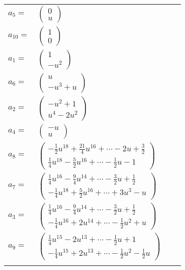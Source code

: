 \documentclass[1p]{elsarticle_modified}
\theoremstyle{definition}
\begin{document}
\begin{tabular}{m{7pt} m{180pt} m{7pt} m{180pt} }
\flushright $a_{5}=$&$\begin{pmatrix}0\\u\end{pmatrix}$ \\
\flushright $a_{10}=$&$\begin{pmatrix}1\\0\end{pmatrix}$ \\
\flushright $a_{1}=$&$\begin{pmatrix}1\\- u^2\end{pmatrix}$ \\
\flushright $a_{6}=$&$\begin{pmatrix}u\\- u^3+u\end{pmatrix}$ \\
\flushright $a_{2}=$&$\begin{pmatrix}- u^2+1\\u^4-2 u^2\end{pmatrix}$ \\
\flushright $a_{4}=$&$\begin{pmatrix}- u\\u\end{pmatrix}$ \\
\flushright $a_{8}=$&$\begin{pmatrix}-\frac{1}{2} u^{18}+\frac{21}{4} u^{16}+\cdots-2 u+\frac{3}{2}\\\frac{1}{4} u^{18}-\frac{5}{2} u^{16}+\cdots-\frac{1}{2} u-1\end{pmatrix}$ \\
\flushright $a_{7}=$&$\begin{pmatrix}\frac{1}{4} u^{16}-\frac{9}{4} u^{14}+\cdots-\frac{3}{2} u+\frac{1}{2}\\-\frac{1}{4} u^{18}+\frac{5}{2} u^{16}+\cdots+3 u^3- u\end{pmatrix}$ \\
\flushright $a_{3}=$&$\begin{pmatrix}\frac{1}{4} u^{16}-\frac{9}{4} u^{14}+\cdots-\frac{3}{2} u+\frac{1}{2}\\-\frac{1}{4} u^{16}+2 u^{14}+\cdots-\frac{1}{2} u^2+u\end{pmatrix}$ \\
\flushright $a_{9}=$&$\begin{pmatrix}\frac{1}{4} u^{15}-2 u^{13}+\cdots-\frac{1}{2} u+1\\-\frac{1}{4} u^{15}+2 u^{13}+\cdots-\frac{1}{2} u^2-\frac{1}{2} u\end{pmatrix}$\\&\end{tabular}
\end{document}
